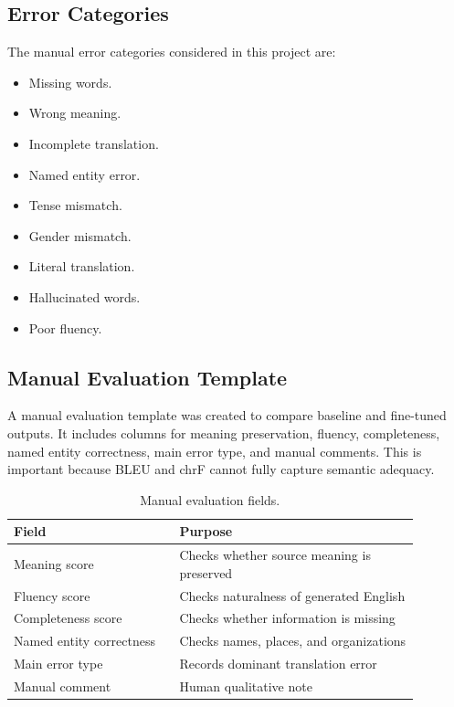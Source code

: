 \documentclass[conference]{IEEEtran}
\begin{document}
\subsection{Error Categories}

The manual error categories considered in this project are:

\begin{itemize}
    \item Missing words.
    \item Wrong meaning.
    \item Incomplete translation.
    \item Named entity error.
    \item Tense mismatch.
    \item Gender mismatch.
    \item Literal translation.
    \item Hallucinated words.
    \item Poor fluency.
\end{itemize}

\subsection{Manual Evaluation Template}

A manual evaluation template was created to compare baseline and fine-tuned outputs. It includes columns for meaning preservation, fluency, completeness, named entity correctness, main error type, and manual comments. This is important because BLEU and chrF cannot fully capture semantic adequacy.

\begin{table}[H]
\centering
\caption{Manual evaluation fields.}
\footnotesize
\begin{tabular}{p{0.36\linewidth}p{0.52\linewidth}}
\toprule
\textbf{Field} & \textbf{Purpose} \\
\midrule
Meaning score & Checks whether source meaning is preserved \\
Fluency score & Checks naturalness of generated English \\
Completeness score & Checks whether information is missing \\
Named entity correctness & Checks names, places, and organizations \\
Main error type & Records dominant translation error \\
Manual comment & Human qualitative note \\
\bottomrule
\end{tabular}
\end{table}
\end{document}
